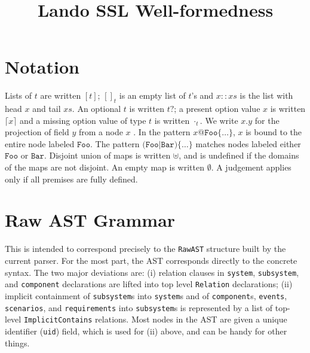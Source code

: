 \documentclass{article}
\begin{document}
\title{Lando SSL Well-formedness}
\maketitle

\section{Notation}

\newcommand{\nt}[1]{\ensuremath{\mathit{#1}}}
\newcommand{\lab}[1]{\ensuremath{\texttt{#1}}}
\newcommand{\listof}[1]{\ensuremath{[{#1}]}}
\newcommand{\nillist}[1]{[]_{#1}}
\newcommand{\conslist}[2]{{#1}::{#2}}
\newcommand{\optof}[1]{\ensuremath{{#1}?}}
\newcommand{\some}[1]{\lceil{#1}\rceil}
\newcommand{\none}[1]{\cdot_{#1}}
\newcommand{\proj}[2]{\ensuremath{{#1}.{#2}}}
\newcommand{\emptym}{\emptyset} 

Lists of $t$ are written $\listof{t}$; $\nillist{t}$ is an empty list of $t$'s and $\conslist{x}{xs}$ is the list with head $x$ and tail $xs$.
An optional $t$ is written $\optof{t}$; a present option value $x$ is written $\some{x}$ and a missing option value of type $t$ is written $\none{t}$.
We write $\proj{x}{y}$ for the projection of field $y$ from a node $x$ .
In the pattern $x@\lab{Foo}\{\ldots\}$, $x$ is bound to the entire node labeled $\lab{Foo}$.
The pattern $\lab{(Foo|Bar)}\{\ldots\}$ matches nodes labeled either $\lab{Foo}$ or $\lab{Bar}$.
Disjoint union of maps is written $\uplus$, and is undefined if the domains of the maps are not disjoint.  An empty map is written $\emptym$.
A judgement applies only if all premises are fully defined.
\section{Raw AST Grammar}

This is intended to correspond precisely to the {\tt RawAST} structure built by the current parser. For the most part, the
AST corresponds directly to the concrete syntax. The two major deviations are: (i) relation clauses in {\tt system}, {\tt subsystem}, and
{\tt component} declarations are lifted into top level {\tt Relation} declarations; (ii) implicit containment of {\tt subsystem}s into
{\tt system}s and of {\tt component}s, {\tt events}, {\tt scenarios}, and {\tt requirements} into {\tt subsystem}s is represented by a list of top-level {\tt ImplicitContains} relations.
Most nodes in the AST are given a unique identifier ({\tt uid}) field, which is used for (ii) above, and can be handy for other things.
\end{document}
